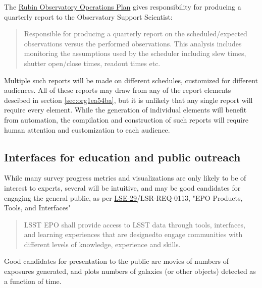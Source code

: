 The \href{https://docushare.lsst.org/docushare/dsweb/Get/Document-36797/Rubin\%20Observatory\%20Operations\%20Plan\%20April\%202020.pdf}{Rubin Observatory Operations Plan} gives responsibility for producing a quarterly report to the Observatory Support Scientist:
\begin{quote}
Responsible for producing a quarterly report on the scheduled/expected observations versus the performed observations. This analysis includes monitoring the assumptions used by the scheduler including slew times, shutter open/close times, readout times etc. 
\end{quote}

Multiple such reports will be made on different schedules, customized for different audiences.
All of these reports may draw from any of the report elements descibed in section \ref{sec:org1ea54ba}, but it is unlikely that any single report will require every element.
While the generation of individual elements will benefit from automation, the compilation and construction of such reports will require human attention and customization to each audience.

\subsection{Interfaces for education and public outreach}
\label{sec:org299b4df}
While many survey progress metrics and visualizations are only likely to be of interest to experts, several will be intuitive, and may be good candidates for engaging the general public, as per \href{https://ls.st/lse-29}{LSE-29}/LSR-REQ-0113, "EPO Products, Tools, and Interfaces"
\begin{quote}
LSST EPO shall provide access to LSST data through tools, interfaces,
and learning experiences that are designedto engage communities with
different levels of knowledge, experience and skills.
\end{quote}
Good candidates for presentation to the public are movies of numbers of exposures generated, and plots numbers of galaxies (or other objects) detected as a function of time.
